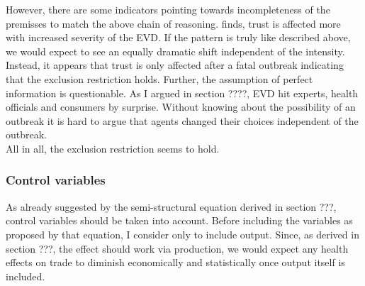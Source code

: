 \documentclass{article}
\begin{document}
However, there are some indicators pointing towards incompleteness of the premisses to match the above chain of reasoning. \cite{gonzalez2017epidemics} finds, trust is affected more with increased severity of the EVD. If the pattern is truly like described above, we would expect to see an equally dramatic shift independent of the intensity. Instead, it appears that trust is only affected after a fatal outbreak indicating that the exclusion restriction holds. Further, the assumption of perfect information is questionable. As I argued in section ????, EVD hit experts, health officials and consumers by surprise. Without knowing about the possibility of an outbreak it is hard to argue that agents changed their choices independent of the outbreak.\\
All in all, the exclusion restriction seems to hold.

\subsubsection{Control variables}

As already suggested by the semi-structural equation derived in section ???, control variables should be taken into account. Before including the variables as proposed by that equation, I consider only to include output. Since, as derived in section ???, the effect should work via production, we would expect any health effects on trade to diminish economically and statistically once output itself is included. \\ 
\end{document}

